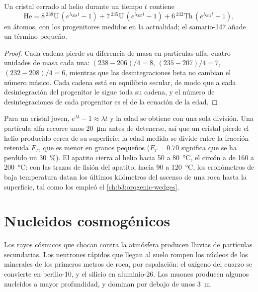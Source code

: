 \begin{theorem}\label{thm:b3:advanced-geochronology:helium}
Un cristal cerrado al helio durante un tiempo $t$ contiene
\[
\mathrm{He} = 8\,{}^{238}\mathrm U\,(e^{\lambda_{238}t} - 1)
+ 7\,{}^{235}\mathrm U\,(e^{\lambda_{235}t} - 1)
+ 6\,{}^{232}\mathrm{Th}\,(e^{\lambda_{232}t} - 1),
\]
en átomos, con los progenitores medidos en la actualidad; el samario-147 añade un término pequeño.
\end{theorem}

\begin{proof}
Cada cadena pierde su diferencia de masa en partículas alfa, cuatro unidades de masa cada una:
$(238 - 206)/4 = 8$, $(235 - 207)/4 = 7$, $(232 - 208)/4 = 6$, mientras que las
desintegraciones beta no cambian el número másico. Cada cadena está en equilibrio
secular, de modo que a cada desintegración del progenitor le sigue toda su cadena, y el
número de desintegraciones de cada progenitor es el de la ecuación de la edad.
\end{proof}

Para un cristal joven, $e^{\lambda t} - 1 \approx \lambda t$ y la edad se obtiene
con una sola división. Una partícula alfa recorre unos
\qty{20}{\micro\metre} antes de detenerse, así que un cristal pierde el helio producido
cerca de su superficie; la edad medida se divide entre la fracción retenida $F_T$,
que es menor en granos pequeños ($F_T = 0.70$ significa que se ha perdido
un \qty{30}{\percent}). El apatito cierra al helio hacia 50 a \qty{80}{\celsius}, el circón a
de 160 a \qty{200}{\celsius}: con las trazas de fisión del apatito, hacia 90 a
\qty{120}{\celsius}, los cronómetros de baja temperatura datan los últimos
kilómetros del ascenso de una roca hasta la superficie, tal como los empleó
el \cref{ch:b3:orogenic-wedges}.

\section{Nucleidos cosmogénicos}\label{sec:b3:advanced-geochronology:cosmogenic}

Los rayos cósmicos que chocan contra la atmósfera producen lluvias de partículas
secundarias. Los neutrones rápidos que llegan al suelo rompen los núcleos de los minerales
de los primeros metros de roca, por espalación: el oxígeno del cuarzo se convierte en berilio-10, y el silicio
en aluminio-26. Los muones producen algunos nucleidos a mayor profundidad, y dominan por debajo de
unos \qty{3}{m}.

